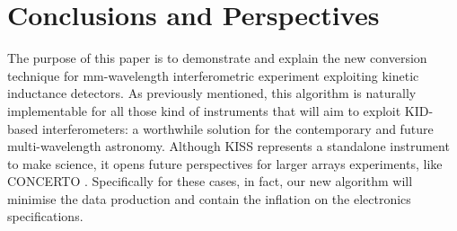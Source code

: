 \documentclass[twocolumn,traditabstract]{aa}\\
\begin{document}
\section{Conclusions and Perspectives}
\label{sec:conclu}
The purpose of this paper is to demonstrate and explain the new conversion technique for mm-wavelength interferometric experiment exploiting kinetic inductance detectors. As previously mentioned, this algorithm is naturally implementable for all those kind of instruments that will aim to exploit KID-based interferometers: a worthwhile solution for the contemporary and future multi-wavelength astronomy. Although KISS represents a standalone instrument to make science, it opens future perspectives for larger arrays experiments, like CONCERTO \cite{concerto}. Specifically for these cases, in fact, our new algorithm will minimise the data production and contain the inflation on the electronics specifications.


\end{document}
